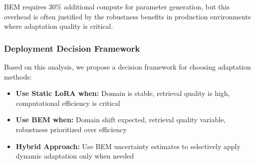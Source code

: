 BEM requires 30\% additional compute for parameter generation, but this overhead is often justified by the robustness benefits in production environments where adaptation quality is critical.

\subsubsection{Deployment Decision Framework}

Based on this analysis, we propose a decision framework for choosing adaptation methods:

\begin{itemize}
    \item \textbf{Use Static LoRA when:} Domain is stable, retrieval quality is high, computational efficiency is critical
    \item \textbf{Use BEM when:} Domain shift expected, retrieval quality variable, robustness prioritized over efficiency
    \item \textbf{Hybrid Approach:} Use BEM uncertainty estimates to selectively apply dynamic adaptation only when needed
\end{itemize}